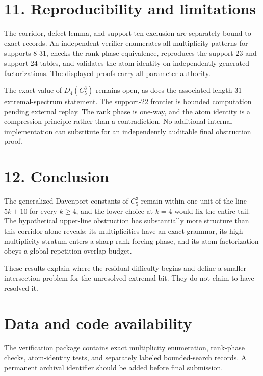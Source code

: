 \documentclass[
  11pt,
]{article}
\begin{document}
\hypertarget{reproducibility-and-limitations}{%
\section{11. Reproducibility and
limitations}\label{reproducibility-and-limitations}}

The corridor, defect lemma, and support-ten exclusion are separately
bound to exact records. An independent verifier enumerates all
multiplicity patterns for supports 8-31, checks the rank-phase
equivalence, reproduces the support-23 and support-24 tables, and
validates the atom identity on independently generated factorizations.
The displayed proofs carry all-parameter authority.

The exact value of \(D_4(C_5^3)\) remains open, as does the associated
length-31 extremal-spectrum statement. The support-22 frontier is
bounded computation pending external replay. The rank phase is one-way,
and the atom identity is a compression principle rather than a
contradiction. No additional internal implementation can substitute for
an independently auditable final obstruction proof.

\hypertarget{conclusion}{%
\section{12. Conclusion}\label{conclusion}}

The generalized Davenport constants of \(C_5^3\) remain within one unit
of the line \(5k+10\) for every \(k\ge4\), and the lower choice at
\(k=4\) would fix the entire tail. The hypothetical upper-line
obstruction has substantially more structure than this corridor alone
reveals: its multiplicities have an exact grammar, its high-multiplicity
stratum enters a sharp rank-forcing phase, and its atom factorization
obeys a global repetition-overlap budget.

These results explain where the residual difficulty begins and define a
smaller intersection problem for the unresolved extremal bit. They do
not claim to have resolved it.

\hypertarget{data-and-code-availability}{%
\section{Data and code availability}\label{data-and-code-availability}}

The verification package contains exact multiplicity enumeration,
rank-phase checks, atom-identity tests, and separately labeled
bounded-search records. A permanent archival identifier should be added
before final submission.
\end{document}
